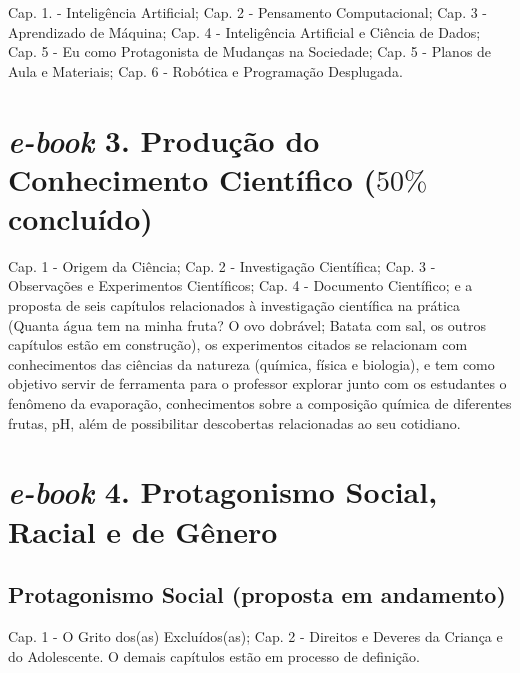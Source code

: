 \documentclass[
]{book}
\begin{document}
Cap. 1. - Inteligência Artificial; Cap. 2 - Pensamento Computacional; Cap. 3 - Aprendizado de Máquina; Cap. 4 - Inteligência Artificial e Ciência de Dados; Cap. 5 - Eu como Protagonista de Mudanças na Sociedade; Cap. 5 - Planos de Aula e Materiais; Cap. 6 - Robótica e Programação Desplugada.

\hypertarget{e-book-3.-produuxe7uxe3o-do-conhecimento-cientuxedfico-50-concluuxeddo}{%
\section{\texorpdfstring{\emph{e-book} 3. Produção do Conhecimento Científico (\(50\%\) concluído)}{e-book 3. Produção do Conhecimento Científico (50\textbackslash\% concluído)}}\label{e-book-3.-produuxe7uxe3o-do-conhecimento-cientuxedfico-50-concluuxeddo}}

Cap. 1 - Origem da Ciência; Cap. 2 - Investigação Científica; Cap. 3 - Observações e Experimentos Científicos; Cap. 4 - Documento Científico; e a proposta de seis capítulos relacionados à investigação científica na prática (Quanta água tem na minha fruta? O ovo dobrável; Batata com sal, os outros capítulos estão em construção), os experimentos citados se relacionam com conhecimentos das ciências da natureza (química, física e biologia), e tem como objetivo servir de ferramenta para o professor explorar junto com os estudantes o fenômeno da evaporação, conhecimentos sobre a composição química de diferentes frutas, pH, além de possibilitar descobertas relacionadas ao seu cotidiano.

\hypertarget{e-book-4.-protagonismo-social-racial-e-de-guxeanero}{%
\section{\texorpdfstring{\emph{e-book} 4. Protagonismo Social, Racial e de Gênero}{e-book 4. Protagonismo Social, Racial e de Gênero}}\label{e-book-4.-protagonismo-social-racial-e-de-guxeanero}}

\hypertarget{protagonismo-social-proposta-em-andamento}{%
\subsection{Protagonismo Social (proposta em andamento)}\label{protagonismo-social-proposta-em-andamento}}

Cap. 1 - O Grito dos(as) Excluídos(as); Cap. 2 - Direitos e Deveres da Criança e do Adolescente. O demais capítulos estão em processo de definição.
\end{document}
